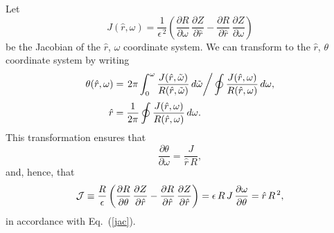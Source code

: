 \documentclass[12pt,prb,aps]{revtex4-1}
\begin{document}
Let
\begin{equation}
J(\hat{r},\omega) = \frac{1}{\epsilon^{\,2}}\left(\frac{\partial R}{\partial\omega}\,\frac{\partial Z}{\partial \hat{r}} -\frac{\partial R}{\partial \hat{r}}\,\frac{\partial Z}{\partial \omega}\right)
\end{equation}
be the Jacobian of the $\hat{r}$, $\omega$ coordinate system. We can transform to the $\hat{r}$, $\theta$ coordinate system 
by writing
\begin{align}\label{e11}
\theta(\hat{r},\omega) &= \left.2\pi\int_0^\omega \frac{J(\hat{r},\tilde{\omega})}{R(\hat{r},\tilde{\omega})}\,d\tilde{\omega}\right/\oint\frac{J(\hat{r},\omega)}{R(\hat{r},\omega)}\,d\omega,\\[0.5ex]
\hat{r}&=\frac{1}{2\pi}\oint\frac{J(\hat{r},\omega)}{R(\hat{r},\omega)}\,d\omega.\label{e12}
\end{align}
This transformation ensures that 
\begin{equation}
\frac{\partial\theta}{\partial\omega} = \frac{J}{\hat{r}\,R},
\end{equation}
and, hence, that 
\begin{equation}
{\cal J} \equiv \frac{R}{\epsilon} \left(\frac{\partial R}{\partial\theta}\,\frac{\partial Z}{\partial \hat{r}} -\frac{\partial R}{\partial \hat{r}}\,\frac{\partial Z}{\partial \hat{r}}\right)
=\epsilon\, R\,J\,\frac{\partial\omega}{\partial\theta} =\hat{r}\,R^{\,2},
\end{equation}
in accordance with Eq.~(\ref{jac}). 
\end{document}
